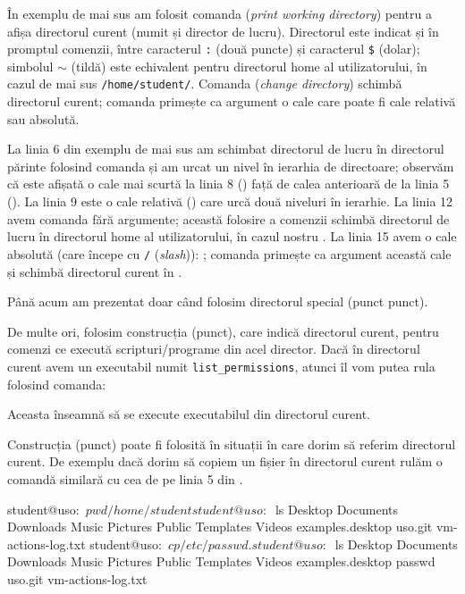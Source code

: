 În exemplu de mai sus am folosit comanda  (\textit{print working directory}) pentru a afișa directorul curent (numit și director de lucru).
Directorul este indicat și în promptul comenzii, între caracterul \texttt{:} (două puncte) și caracterul \texttt{\$} (dolar);
simbolul \texttt{$\sim$} (tildă) este echivalent pentru directorul home al utilizatorului, în cazul de mai sus \texttt{/home/student/}.
Comanda  (\textit{change directory}) schimbă directorul curent;
comanda primește ca argument o cale care poate fi cale relativă sau absolută.

La linia 6 din exemplu de mai sus am schimbat directorul de lucru în directorul părinte folosind comanda  și am urcat un nivel în ierarhia de directoare;
observăm că este afișată o cale mai scurtă la linia 8 () față de calea anterioară de la linia 5 ().
La linia 9 este o cale relativă () care urcă două niveluri în ierarhie.
La linia 12 avem comanda  fără argumente;
această folosire a comenzii schimbă directorul de lucru în directorul home al utilizatorului, în cazul nostru .
La linia 15 avem o cale absolută (care începe cu \texttt{/} (\textit{slash})): ;
comanda  primește ca argument această cale și schimbă directorul curent în .

Până acum am prezentat doar când folosim directorul special  (punct punct).

De multe ori, folosim construcția  (punct), care indică directorul curent, pentru comenzi ce execută scripturi/programe din acel director.
Dacă în directorul curent avem un executabil numit \texttt{list\_permissions}, atunci îl vom putea rula folosind comanda:


Aceasta înseamnă să se execute executabilul  din directorul curent.

Construcția  (punct) poate fi folosită în situații în care dorim să referim directorul curent.
De exemplu dacă dorim să copiem un fișier în directorul curent rulăm o comandă similară cu cea de pe linia 5 din .

\begin{screen}[caption={Referința . către directorul curent},label={lst:fs:dot}]
student@uso:~$ pwd
/home/student
student@uso:~$ ls
Desktop  Documents  Downloads  Music  Pictures  Public  Templates  Videos  examples.desktop  uso.git  vm-actions-log.txt
student@uso:~$ cp /etc/passwd .
student@uso:~$ ls
Desktop  Documents  Downloads  Music  Pictures  Public  Templates  Videos  examples.desktop  passwd  uso.git  vm-actions-log.txt
\end{screen}

